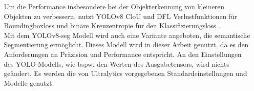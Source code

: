 {{	Um die Performance insbesondere bei der Objekterkennung von kleineren Objekten zu verbessern, nutzt YOLOv8 CloU \citep{Zheng2020} und DFL \citep{Li2020} Verlustfunktionen für Boundingboxloss und binäre Kreuzentropie für den Klassifizierungsloss \citep{Terven2023}. \\

	Mit dem YOLOv8-seg Modell wird auch eine Variante angeboten, die semantische Segmentierung ermöglicht. Dieses Modell wird in dieser Arbeit genutzt, da es den Anforderungen an Präzision und Performance entspricht. An den Einstellungen des YOLO-Modells, wie bspw. den Werten des Ausgabetensors, wird nichts geändert. Es werden die von Ultralytics vorgegebenen Standardeinstellungen und Modelle genutzt.
	}
}
